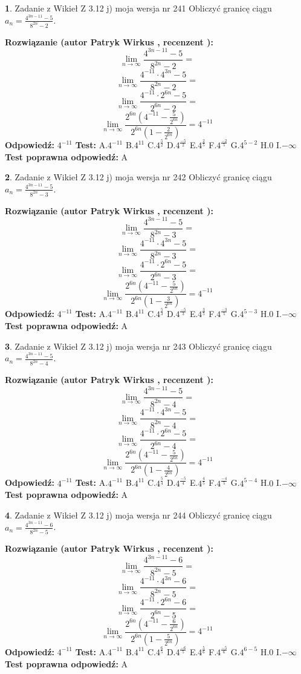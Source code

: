 \documentclass[12pt, a4paper]{article}
\theoremstyle{definition} %
\newtheorem{zad}{}
\newcommand{\zadStart}[1]{\begin{zad}#1\newline}
\newcommand{\zadStop}{\end{zad}}
\newcommand{\rozwStart}[2]{\noindent \textbf{Rozwiązanie (autor #1 , recenzent #2): }\newline}
\newcommand{\rozwStop}{\newline}
\newcommand{\odpStart}{\noindent \textbf{Odpowiedź:}\newline}
\newcommand{\odpStop}{\newline}
\newcommand{\testStart}{\noindent \textbf{Test:}\newline}
\newcommand{\testStop}{\newline}
\newcommand{\kluczStart}{\noindent \textbf{Test poprawna odpowiedź:}\newline}
\newcommand{\kluczStop}{\newline}
\begin{document}
\zadStart{Zadanie z Wikieł Z 3.12 j) moja wersja nr 241}
Obliczyć granicę ciągu $a_{n}=\frac{4^{3n-11}-5}{8^{2n}-2}$.
\zadStop
\rozwStart{Patryk Wirkus}{}
$$\lim\limits_{n\to\infty}\frac{4^{3n-11}-5}{8^{2n}-2}=$$
$$\lim\limits_{n\to\infty}\frac{4^{-11} \cdot 4^{3n}-5}{8^{2n}-2}=$$
$$\lim\limits_{n\to\infty}\frac{4^{-11} \cdot 2^{6n}-5}{2^{6n}-2}=$$
$$\lim\limits_{n\to\infty}\frac{2^{6n}(4^{-11} - \frac{5}{2^{6n}})}{2^{6n}(1-\frac{2}{2^{6n}})}= 4^{-11}$$
\rozwStop
\odpStart
$4^{-11}$
\odpStop
\testStart
A.$4^{-11}$
B.$4^{11}$
C.$4^{\frac{5}{2}}$
D.$4^{\frac{-5}{2}}$
E.$4^{\frac{2}{5}}$
F.$4^{\frac{-2}{5}}$
G.$4^{5-2}$
H.$0$
I.$-\infty$
\testStop
\kluczStart
A
\kluczStop



\zadStart{Zadanie z Wikieł Z 3.12 j) moja wersja nr 242}
Obliczyć granicę ciągu $a_{n}=\frac{4^{3n-11}-5}{8^{2n}-3}$.
\zadStop
\rozwStart{Patryk Wirkus}{}
$$\lim\limits_{n\to\infty}\frac{4^{3n-11}-5}{8^{2n}-3}=$$
$$\lim\limits_{n\to\infty}\frac{4^{-11} \cdot 4^{3n}-5}{8^{2n}-3}=$$
$$\lim\limits_{n\to\infty}\frac{4^{-11} \cdot 2^{6n}-5}{2^{6n}-3}=$$
$$\lim\limits_{n\to\infty}\frac{2^{6n}(4^{-11} - \frac{5}{2^{6n}})}{2^{6n}(1-\frac{3}{2^{6n}})}= 4^{-11}$$
\rozwStop
\odpStart
$4^{-11}$
\odpStop
\testStart
A.$4^{-11}$
B.$4^{11}$
C.$4^{\frac{5}{3}}$
D.$4^{\frac{-5}{3}}$
E.$4^{\frac{3}{5}}$
F.$4^{\frac{-3}{5}}$
G.$4^{5-3}$
H.$0$
I.$-\infty$
\testStop
\kluczStart
A
\kluczStop



\zadStart{Zadanie z Wikieł Z 3.12 j) moja wersja nr 243}
Obliczyć granicę ciągu $a_{n}=\frac{4^{3n-11}-5}{8^{2n}-4}$.
\zadStop
\rozwStart{Patryk Wirkus}{}
$$\lim\limits_{n\to\infty}\frac{4^{3n-11}-5}{8^{2n}-4}=$$
$$\lim\limits_{n\to\infty}\frac{4^{-11} \cdot 4^{3n}-5}{8^{2n}-4}=$$
$$\lim\limits_{n\to\infty}\frac{4^{-11} \cdot 2^{6n}-5}{2^{6n}-4}=$$
$$\lim\limits_{n\to\infty}\frac{2^{6n}(4^{-11} - \frac{5}{2^{6n}})}{2^{6n}(1-\frac{4}{2^{6n}})}= 4^{-11}$$
\rozwStop
\odpStart
$4^{-11}$
\odpStop
\testStart
A.$4^{-11}$
B.$4^{11}$
C.$4^{\frac{5}{4}}$
D.$4^{\frac{-5}{4}}$
E.$4^{\frac{4}{5}}$
F.$4^{\frac{-4}{5}}$
G.$4^{5-4}$
H.$0$
I.$-\infty$
\testStop
\kluczStart
A
\kluczStop



\zadStart{Zadanie z Wikieł Z 3.12 j) moja wersja nr 244}
Obliczyć granicę ciągu $a_{n}=\frac{4^{3n-11}-6}{8^{2n}-5}$.
\zadStop
\rozwStart{Patryk Wirkus}{}
$$\lim\limits_{n\to\infty}\frac{4^{3n-11}-6}{8^{2n}-5}=$$
$$\lim\limits_{n\to\infty}\frac{4^{-11} \cdot 4^{3n}-6}{8^{2n}-5}=$$
$$\lim\limits_{n\to\infty}\frac{4^{-11} \cdot 2^{6n}-6}{2^{6n}-5}=$$
$$\lim\limits_{n\to\infty}\frac{2^{6n}(4^{-11} - \frac{6}{2^{6n}})}{2^{6n}(1-\frac{5}{2^{6n}})}= 4^{-11}$$
\rozwStop
\odpStart
$4^{-11}$
\odpStop
\testStart
A.$4^{-11}$
B.$4^{11}$
C.$4^{\frac{6}{5}}$
D.$4^{\frac{-6}{5}}$
E.$4^{\frac{5}{6}}$
F.$4^{\frac{-5}{6}}$
G.$4^{6-5}$
H.$0$
I.$-\infty$
\testStop
\kluczStart
A
\kluczStop
\end{document}
